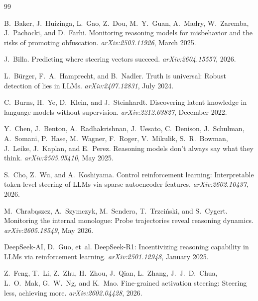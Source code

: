 \documentclass[11pt]{article}
\theoremstyle{definition}
\newcommand{\1}{\mathbf{1}}
\begin{document}

\begin{thebibliography}{99}

B.~Baker, J.~Huizinga, L.~Gao, Z.~Dou, M.~Y.~Guan, A.~Madry, W.~Zaremba, J.~Pachocki, and D.~Farhi.
\newblock Monitoring reasoning models for misbehavior and the risks of promoting obfuscation.
\newblock \emph{arXiv:2503.11926}, March 2025.

J.~Billa.
\newblock Predicting where steering vectors succeed.
\newblock \emph{arXiv:2604.15557}, 2026.

L.~B\"urger, F.~A.~Hamprecht, and B.~Nadler.
\newblock Truth is universal: Robust detection of lies in LLMs.
\newblock \emph{arXiv:2407.12831}, July 2024.

C.~Burns, H.~Ye, D.~Klein, and J.~Steinhardt.
\newblock Discovering latent knowledge in language models without supervision.
\newblock \emph{arXiv:2212.03827}, December 2022.

Y.~Chen, J.~Benton, A.~Radhakrishnan, J.~Uesato, C.~Denison, J.~Schulman, A.~Somani, P.~Hase, M.~Wagner, F.~Roger, V.~Mikulik, S.~R.~Bowman, J.~Leike, J.~Kaplan, and E.~Perez.
\newblock Reasoning models don't always say what they think.
\newblock \emph{arXiv:2505.05410}, May 2025.

S.~Cho, Z.~Wu, and A.~Koshiyama.
\newblock Control reinforcement learning: Interpretable token-level steering of LLMs via sparse autoencoder features.
\newblock \emph{arXiv:2602.10437}, 2026.

M.~Chrab\k{a}szcz, A.~Szymczyk, M.~Sendera, T.~Trzci\'nski, and S.~Cygert.
\newblock Monitoring the internal monologue: Probe trajectories reveal reasoning dynamics.
\newblock \emph{arXiv:2605.18549}, May 2026.

DeepSeek-AI, D.~Guo, et~al.
\newblock DeepSeek-R1: Incentivizing reasoning capability in LLMs via reinforcement learning.
\newblock \emph{arXiv:2501.12948}, January 2025.

Z.~Feng, T.~Li, Z.~Zhu, H.~Zhou, J.~Qian, L.~Zhang, J.~J.~D.~Chua, L.~O.~Mak, G.~W.~Ng, and K.~Mao.
\newblock Fine-grained activation steering: Steering less, achieving more.
\newblock \emph{arXiv:2602.04428}, 2026.


\end{thebibliography}
\end{document}
